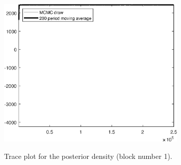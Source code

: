 \begin{figure}[H]
\centering
  \includegraphics[width=0.8\textwidth]{BRS_fd/graphs/TracePlot_Posterior_blck_1}\\
    \caption{Trace plot for the posterior density (block number 1).}
\end{figure}
